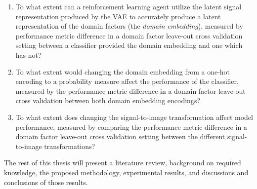 \begin{enumerate}
	\item To what extent can a reinforcement learning agent utilize the latent signal representation produced by the VAE to accurately produce a latent representation of the domain factors (the \textit{domain embedding}), measured by performance metric difference in a domain factor leave-out cross validation setting between a classifier provided the domain embedding and one which has not?
	\item To what extent would changing the domain embedding from a one-hot encoding to a probability measure affect the performance of the classifier, measured by the performance metric difference in a domain factor leave-out cross validation between both domain embedding encodings?
	\item To what extent does changing the signal-to-image transformation affect model performance, measured by comparing the performance metric difference in a domain factor leave-out cross validation setting between the different signal-to-image transformations?
\end{enumerate}

The rest of this thesis will present a literature review, background on required knowledge, the proposed methodology, experimental results, and discussions and conclusions of those results.